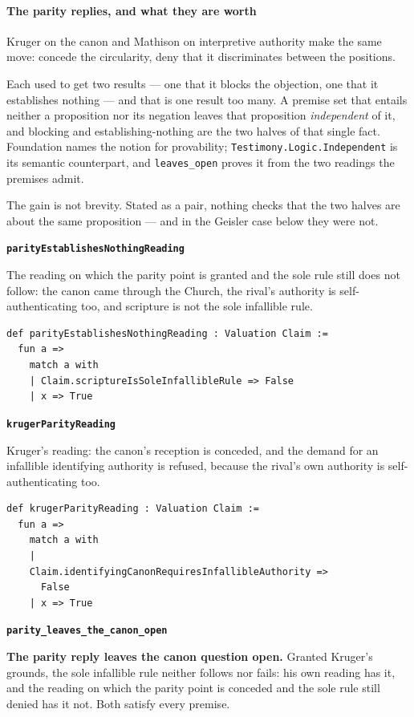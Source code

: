 \documentclass[11pt]{article}
\begin{document}
\paragraph*{The parity replies, and what they are worth}
\leavevmode\par
Kruger on the canon and Mathison on interpretive authority make the same move: concede the circularity, deny that it discriminates between the positions.

Each used to get two results — one that it blocks the objection, one that it establishes nothing — and that is one result too many. A premise set that entails neither a proposition nor its negation leaves that proposition \emph{independent} of it, and blocking and establishing-nothing are the two halves of that single fact. Foundation names the notion for provability; \texttt{Testimony.Logic.Independent} is its semantic counterpart, and \texttt{leaves\_\allowbreak{}open} proves it from the two readings the premises admit.

The gain is not brevity. Stated as a pair, nothing checks that the two halves are about the same proposition — and in the Geisler case below they were not.

\par\medskip\noindent\textbf{\texttt{parity\allowbreak{}Establishes\allowbreak{}Nothing\allowbreak{}Reading}}\par\nobreak\noindent
The reading on which the parity point is granted and the sole rule still does not follow: the canon came through the Church, the rival's authority is self-authenticating too, and scripture is not the sole infallible rule.

{\small\begin{verbatim}
def parityEstablishesNothingReading : Valuation Claim :=
  fun a =>
    match a with
    | Claim.scriptureIsSoleInfallibleRule => False
    | x => True
\end{verbatim}}
\par\medskip\noindent\textbf{\texttt{kruger\allowbreak{}Parity\allowbreak{}Reading}}\par\nobreak\noindent
Kruger's reading: the canon's reception is conceded, and the demand for an infallible identifying authority is refused, because the rival's own authority is self-authenticating too.

{\small\begin{verbatim}
def krugerParityReading : Valuation Claim :=
  fun a =>
    match a with
    |
    Claim.identifyingCanonRequiresInfallibleAuthority =>
      False
    | x => True
\end{verbatim}}
\par\medskip\noindent\textbf{\texttt{parity\_\allowbreak{}leaves\_\allowbreak{}the\_\allowbreak{}canon\_\allowbreak{}open}}\par\nobreak\noindent
\textbf{The parity reply leaves the canon question open.} Granted Kruger's grounds, the sole infallible rule neither follows nor fails: his own reading has it, and the reading on which the parity point is conceded and the sole rule still denied has it not. Both satisfy every premise.
\end{document}
